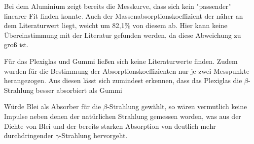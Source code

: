 	Bei dem Aluminium zeigt bereits die Messkurve, dass sich kein "passender" linearer Fit finden konnte.
	Auch der Massenabsorptionskoeffizient der näher an dem Literaturwert liegt, weicht um 82,1\% von diesem ab.
	Hier kann keine Übereinstimmung mit der Literatur gefunden werden, da diese Abweichung zu groß ist.
	
	Für das Plexiglas und Gummi ließen sich keine Literaturwerte finden. 
	Zudem wurden für die Bestimmung der Absorptionskoeffizienten nur je zwei Messpunkte herangezogen.
	Aus diesen lässt sich zumindest erkennen, dass das Plexiglas die $\beta$-Strahlung besser absorbiert als Gummi
	
	Würde Blei als Absorber für die $\beta$-Strahlung gewählt, so wären vermutlich keine Impulse neben denen der natürlichen Strahlung gemessen worden, was aus der Dichte von Blei und der bereits starken Absorption von deutlich mehr durchdringender $\gamma$-Strahlung hervorgeht.
	